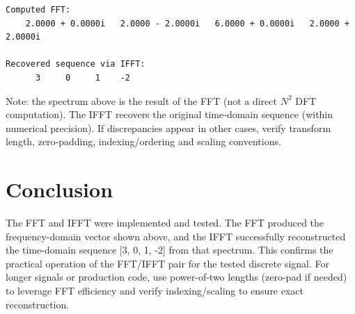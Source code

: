 \documentclass[11pt]{article}
\begin{document}
\begin{verbatim}
Computed FFT:
    2.0000 + 0.0000i   2.0000 - 2.0000i   6.0000 + 0.0000i   2.0000 + 2.0000i

Recovered sequence via IFFT:
      3     0     1    -2
\end{verbatim}

Note: the spectrum above is the result of the FFT (not a direct $N^2$ DFT computation). The IFFT recovers the original time-domain sequence (within numerical precision). If discrepancies appear in other cases, verify transform length, zero-padding, indexing/ordering and scaling conventions.

\section*{Conclusion}
The FFT and IFFT were implemented and tested. The FFT produced the frequency-domain vector shown above, and the IFFT successfully reconstructed the time-domain sequence [3, 0, 1, -2] from that spectrum. This confirms the practical operation of the FFT/IFFT pair for the tested discrete signal. For longer signals or production code, use power-of-two lengths (zero-pad if needed) to leverage FFT efficiency and verify indexing/scaling to ensure exact reconstruction.


\renewcommand{\bibname}{References}

\end{document}
